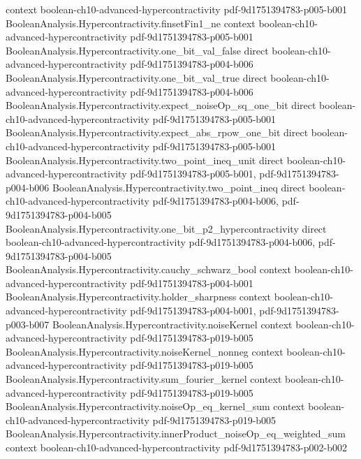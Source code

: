 \begin{theorem}
  {context}
  {boolean-ch10-advanced-hypercontractivity}
  {pdf-9d1751394783-p005-b001}
\proofstep
  {BooleanAnalysis.Hypercontractivity.finsetFin1_ne}
  {context}
  {boolean-ch10-advanced-hypercontractivity}
  {pdf-9d1751394783-p005-b001}
\proofstep
  {BooleanAnalysis.Hypercontractivity.one_bit_val_false}
  {direct}
  {boolean-ch10-advanced-hypercontractivity}
  {pdf-9d1751394783-p004-b006}
\proofstep
  {BooleanAnalysis.Hypercontractivity.one_bit_val_true}
  {direct}
  {boolean-ch10-advanced-hypercontractivity}
  {pdf-9d1751394783-p004-b006}
\proofstep
  {BooleanAnalysis.Hypercontractivity.expect_noiseOp_sq_one_bit}
  {direct}
  {boolean-ch10-advanced-hypercontractivity}
  {pdf-9d1751394783-p005-b001}
\proofstep
  {BooleanAnalysis.Hypercontractivity.expect_abs_rpow_one_bit}
  {direct}
  {boolean-ch10-advanced-hypercontractivity}
  {pdf-9d1751394783-p005-b001}
\proofstep
  {BooleanAnalysis.Hypercontractivity.two_point_ineq_unit}
  {direct}
  {boolean-ch10-advanced-hypercontractivity}
  {pdf-9d1751394783-p005-b001,
    pdf-9d1751394783-p004-b006}
\proofstep
  {BooleanAnalysis.Hypercontractivity.two_point_ineq}
  {direct}
  {boolean-ch10-advanced-hypercontractivity}
  {pdf-9d1751394783-p004-b006,
    pdf-9d1751394783-p004-b005}
\proofstep
  {BooleanAnalysis.Hypercontractivity.one_bit_p2_hypercontractivity}
  {direct}
  {boolean-ch10-advanced-hypercontractivity}
  {pdf-9d1751394783-p004-b006,
    pdf-9d1751394783-p004-b005}
\proofstep
  {BooleanAnalysis.Hypercontractivity.cauchy_schwarz_bool}
  {context}
  {boolean-ch10-advanced-hypercontractivity}
  {pdf-9d1751394783-p004-b001}
\proofstep
  {BooleanAnalysis.Hypercontractivity.holder_sharpness}
  {context}
  {boolean-ch10-advanced-hypercontractivity}
  {pdf-9d1751394783-p004-b001,
    pdf-9d1751394783-p003-b007}
\proofstep
  {BooleanAnalysis.Hypercontractivity.noiseKernel}
  {context}
  {boolean-ch10-advanced-hypercontractivity}
  {pdf-9d1751394783-p019-b005}
\proofstep
  {BooleanAnalysis.Hypercontractivity.noiseKernel_nonneg}
  {context}
  {boolean-ch10-advanced-hypercontractivity}
  {pdf-9d1751394783-p019-b005}
\proofstep
  {BooleanAnalysis.Hypercontractivity.sum_fourier_kernel}
  {context}
  {boolean-ch10-advanced-hypercontractivity}
  {pdf-9d1751394783-p019-b005}
\proofstep
  {BooleanAnalysis.Hypercontractivity.noiseOp_eq_kernel_sum}
  {context}
  {boolean-ch10-advanced-hypercontractivity}
  {pdf-9d1751394783-p019-b005}
\proofstep
  {BooleanAnalysis.Hypercontractivity.innerProduct_noiseOp_eq_weighted_sum}
  {context}
  {boolean-ch10-advanced-hypercontractivity}
  {pdf-9d1751394783-p002-b002}
\proofstep

\end{theorem}

